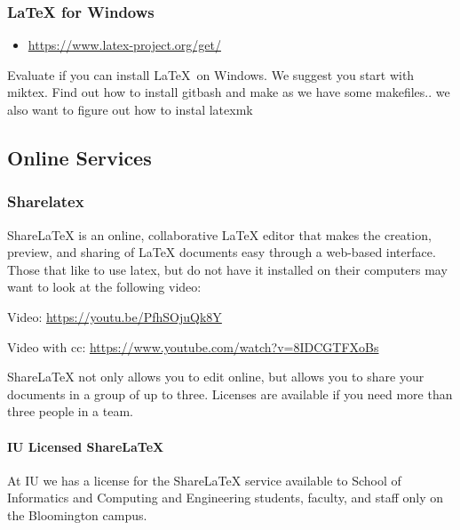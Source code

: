 \subsubsection{LaTeX for Windows}\label{latex-for-windows}

\begin{itemize}

\item
  \url{https://www.latex-project.org/get/}
\end{itemize}



\begin{exercise}

Evaluate if you can install \LaTeX~on Windows. We suggest you start
with miktex. Find out how to install gitbash and make as we have some
makefiles.. we also want to figure out how to instal latexmk

\end{exercise}

\subsection{Online Services}\label{online-services}

\subsubsection{Sharelatex}\label{sharelatex}

ShareLaTeX is an online, collaborative LaTeX editor that makes the
creation, preview, and sharing of LaTeX documents easy through a
web-based interface.  Those that like to use latex, but do not have it
installed on their computers may want to look at the following video:

Video: \url{https://youtu.be/PfhSOjuQk8Y}

Video with cc: \url{https://www.youtube.com/watch?v=8IDCGTFXoBs}

ShareLaTeX not only allows you to edit online, but allows you to share
your documents in a group of up to three. Licenses are available if you
need more than three people in a team.

\paragraph{IU Licensed ShareLaTeX}

At IU we has a license for the ShareLaTeX service available to School
of Informatics and Computing and Engineering students, faculty, and
staff only on the Bloomington campus.  

